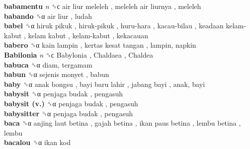 \textbf{babamentu} \emph{n}  ␝ϲ   air liur meleleh ,  meleleh air liurnya , meleleh  \\
\textbf{babando} ␝α   air liur , ludah  \\
\textbf{babel} ␝α   hiruk pikuk ,  hiruk-pikuk ,  huru-hara ,  kacau-bilau ,  keadaan kelam-kabut ,  kelam kabut ,  kelam-kabut , kekacauan  \\
\textbf{babero} ␝α   kain lampin ,  kertas kesat tangan , lampin, napkin  \\
\textbf{Babilonia} \emph{n}  ␝ϲ   Babylonia ,  Chaldaea ,  Chaldea   \\
\textbf{babuca} ␝α  diam, tergamam  \\
\textbf{babun} ␝α   sejenis monyet , babun  \\
\textbf{baby} ␝α   anak bongsu ,  bayi baru lahir ,  jabang bayi , anak, bayi  \\
\textbf{babysit} ␝α   penjaga budak , pengasuh  \\
\textbf{babysit (v.)} ␝α   penjaga budak , pengasuh  \\
\textbf{babysitter} ␝α   penjaga budak , pengasuh  \\
\textbf{baca} ␝α   anjing laut betina ,  gajah betina ,  ikan paus betina ,  lembu betina , lembu  \\
\textbf{bacalou} ␝α   ikan kod   \\
